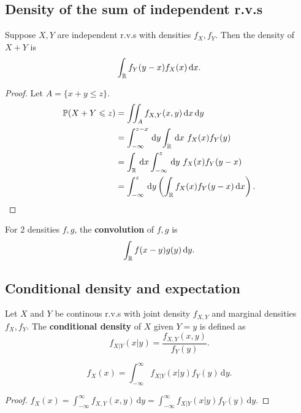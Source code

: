 \subsection{Density of the sum of independent r.v.s}
\begin{proposition}\label{prop:3.10}
    Suppose $ X,Y $ are independent r.v.s with densities $ f_X,f_Y $. Then the density of $ X+Y $ is 
    \[
        \int_{\mathbb{R}} f_Y(y-x)f_X(x)\,\mathrm{d} x .
    \]
\end{proposition}
\begin{proof}
    Let $A=\{x+y\le z\}$.
    \begin{align*}
        \mathbb{P}(X+Y\leqslant z)&=\iint_A f_{X,Y}(x,y)\,\mathrm{d} x\,\mathrm{d} y\\ 
        &= \int_{-\infty}^{z-x} \,\mathrm{d}y \int_{{\mathbb{R}}} \,\mathrm{d}x\ f_X(x)f_Y(y)\\ 
        &= \int_{{\mathbb{R}}} \,\mathrm{d}x \int_{-\infty}^{z} \,\mathrm{d}y\ f_X(x)f_Y(y-x)\\ 
        &= \int_{-\infty}^{z} \,\mathrm{d}y \left( \int_{{\mathbb{R}}} f_X(x)f_Y(y-x)\,\mathrm{d}x \right).\qedhere
    \end{align*}
\end{proof}

\begin{definition}
    For 2 densities $f,g$, the \textbf{convolution} of $f,g$ is 
    \[
        \int_{\mathbb{R}} f(x-y)g(y)\,\mathrm{d} y.
    \]
\end{definition}

\subsection{Conditional density and expectation}
\begin{definition}
    Let $X$ and $Y$ be continous r.v.s with joint density $ f_{X,Y} $ and marginal densities $ f_X,f_Y $. The \textbf{conditional density} of $X$ given $ Y=y $ is defined as 
    \[
        f_{X|Y}(x|y) = \frac{f_{X,Y}(x,y)}{f_Y(y)}.
    \]
\end{definition}
\begin{proposition}
    \[
        f_X(x) = \int_{-\infty}^{\infty} f_{X|Y}(x|y)f_Y(y) \,\mathrm{d}y.
    \]
\end{proposition}
\begin{proof}
    $ f_X(x) = \int_{-\infty}^{\infty} f_{X,Y}(x,y) \,\mathrm{d}y = \int_{-\infty}^{\infty} f_{X|Y}(x|y)f_Y(y) \,\mathrm{d}y. $
\end{proof}

